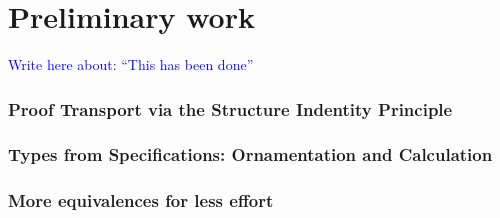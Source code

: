 \documentclass{article}
\theoremstyle{plain}%
\theoremstyle{definition}
\newcommand{\towrite}[1]{\par\textcolor{blue}{Write here about: ``#1''}\par}
\begin{document}
\part{Preliminary work}\label{part:preliminary}
\towrite{This has been done}

\section{Proof Transport via the Structure Indentity Principle}\label{sec:leibniz}


\section{Types from Specifications: Ornamentation and Calculation}\label{sec:numrep}


\section{More equivalences for less effort}\label{sec:userfriendly}


\begin{comment}
\section{FingerTrees}\label{sec:fingertrees}
Fingertrees are often (rightfully so) referred to as ``the fastest persistent datastructure for most purposes'', but while simpler than implementations achieving the same bounds, they are still challenging to reason about; in this section, we will investigate how we can fit the description and analysis of fingertrees, or variants upon them, into the frameworks of calculating datastructures and ornamental programming.

We compare the work in calculating datastructures to solving associativity equations in groups by shifting to the Cayley representation, such as in [..]




\newpage
\section{Temporary}\label{sec:temp}
\listoftodos
%
\end{comment}


\printbibliography
\end{document}
